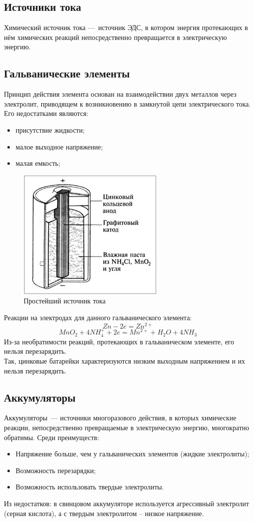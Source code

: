 \documentclass[14pt,a4paper]{scrartcl}
\begin{document}
\subsection*{Источники тока}
Химический источник тока — источник ЭДС, в котором энергия протекающих в нём
химических реакций непосредственно превращается в электрическую энергию.
\subsection*{Гальванические элементы}

Принцип действия элемента основан на взаимодействии двух металлов через электролит, приводящем к возникновению в замкнутой цепи электрического тока.\\
Его недостатками являются:
\begin{itemize}
	\item присутствие жидкости;
	\item малое выходное напряжение; 
	\item малая емкость;
\end{itemize}
\begin{figure}[H]
	\includegraphics[scale=1]{galel.jpg}
	\centering
	\caption{Простейший источник тока}
\end{figure}
Реакции на электродах для данного гальванического элемента:
$$ Zn - 2e = Zn^{2+} $$
$$ MnO_2 + 4NH_4^+ + 2e = Mn^{2+} + H_2O + 4NH_3 $$
Из-за необратимости реакций, протекающих в гальваническом элементе, его нельзя перезарядить.\\
Так, цинковые батарейки характеризуются низким выходным напряжением и их нельзя перезарядить.
\subsection*{Аккумуляторы}
Аккумуляторы — источники многоразового действия, в которых химические реакции,
непосредственно превращаемые в электрическую энергию, многократно обратимы.
Среди преимуществ: 
\begin{itemize}
	\item Напряжение больше, чем у гальванических элементов (жидкие электролиты);
	\item Возможность перезарядки;
	\item Возможность использовать твердые электролиты.
\end{itemize}
Из недостатков: в свинцовом аккумуляторе используется агрессивный электролит (серная кислота), а с твердым электролитом -- низкое напряжение.
\end{document}
